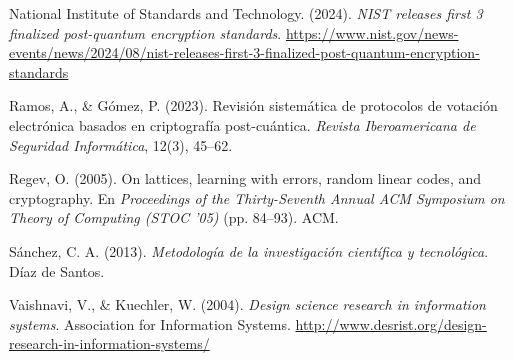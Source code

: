 \begin{flushleft}
	\hangindent=1.25cm
	National Institute of Standards and Technology. (2024). \textit{NIST releases first 3 finalized post-quantum encryption standards}. \url{https://www.nist.gov/news-events/news/2024/08/nist-releases-first-3-finalized-post-quantum-encryption-standards}
	
	\hangindent=1.25cm
	Ramos, A., \& Gómez, P. (2023). Revisión sistemática de protocolos de votación electrónica basados en criptografía post-cuántica. \textit{Revista Iberoamericana de Seguridad Informática}, 12(3), 45--62.
	
	\hangindent=1.25cm
	Regev, O. (2005). On lattices, learning with errors, random linear codes, and cryptography. En \textit{Proceedings of the Thirty-Seventh Annual ACM Symposium on Theory of Computing (STOC '05)} (pp. 84--93). ACM.
	
	\hangindent=1.25cm
	Sánchez, C. A. (2013). \textit{Metodología de la investigación científica y tecnológica}. Díaz de Santos.
	
	\hangindent=1.25cm
	Vaishnavi, V., \& Kuechler, W. (2004). \textit{Design science research in information systems}. Association for Information Systems. \url{http://www.desrist.org/design-research-in-information-systems/}
	
\end{flushleft}


